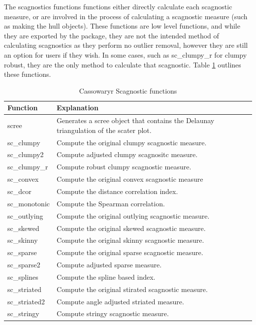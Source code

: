 The scagnostics functions functions either directly calculate each
scagnostic measure, or are involved in the process of calculating a
scagnostic measure (such as making the hull objects). These functions
are low level functions, and while they are exported by the package,
they are not the intended method of calculating scagnostics as they
perform no outlier removal, however they are still an option for users
if they wish. In some cases, such as sc\_clumpy\_r for clumpy robust,
they are the only method to calculate that scagnostic. Table
\ref{tab:scagfuncs-tb-pdf} outlines these functions.

\begin{Schunk}
\begin{table}

\caption{\label{tab:scagfuncs-tb-pdf}Cassowaryr Scagnostic functions}
\centering
\begin{tabular}[t]{>{\raggedright\arraybackslash}p{3cm}>{\raggedright\arraybackslash}p{10cm}}
\toprule
Function & Explanation\\
\midrule
scree & Generates a scree object that contains the Delaunay triangulation of the scater plot.\\
sc\_clumpy & Compute the original clumpy scagnostic measure.\\
sc\_clumpy2 & Compute adjusted clumpy scagnositc measure.\\
sc\_clumpy\_r & Compute robust clumpy scagnostic measure.\\
sc\_convex & Compute the original convex scagnostic measure\\
\addlinespace
sc\_dcor & Compute the distance correlation index.\\
sc\_monotonic & Compute the Spearman correlation.\\
sc\_outlying & Compute the original outlying scagnostic measure.\\
sc\_skewed & Compute the original skewed scagnostic measure.\\
sc\_skinny & Compute the original skinny scagnostic measure.\\
\addlinespace
sc\_sparse & Compute the original sparse scagnostic measure.\\
sc\_sparse2 & Compute adjusted sparse measure.\\
sc\_splines & Compute the spline based index.\\
sc\_striated & Compute the original stirated scagnostic measure.\\
sc\_striated2 & Compute angle adjusted striated measure.\\
\addlinespace
sc\_stringy & Compute stringy scagnostic measure.\\
\bottomrule
\end{tabular}
\end{table}

\end{Schunk}

